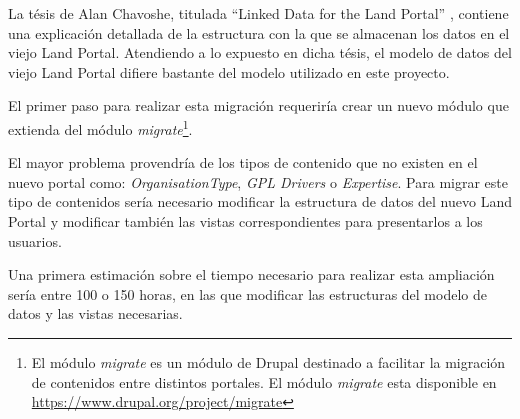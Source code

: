 	La tésis de Alan Chavoshe, titulada ``Linked Data for the Land Portal''
	\cite{lod_landportal}, contiene una explicación detallada de la estructura con la
	que se almacenan los datos en el viejo Land Portal.	Atendiendo a lo expuesto 
	en dicha tésis, el modelo de datos del viejo Land Portal difiere bastante
	del modelo utilizado en este proyecto.  
	
	El primer paso para realizar esta migración requeriría crear un nuevo módulo
	que extienda del módulo \textit{migrate}\footnote{El módulo \textit{migrate}
	es un módulo de Drupal destinado a facilitar la migración de contenidos 
	entre distintos portales.  El módulo \textit{migrate} esta disponible en
	\url{https://www.drupal.org/project/migrate}}.
	
	El mayor problema provendría de los tipos de contenido que no existen en 
	el nuevo portal como:  \textit{OrganisationType}, \textit{GPL Drivers} o
	\textit{Expertise}.  Para migrar este tipo de contenidos sería necesario
	modificar la estructura de datos del nuevo Land Portal y modificar también
	las vistas correspondientes para presentarlos a los usuarios.
	
	Una primera estimación sobre el tiempo necesario para realizar esta ampliación
	sería entre 100 o 150 horas, en las que modificar las estructuras del modelo
	de datos y las vistas necesarias.
	
